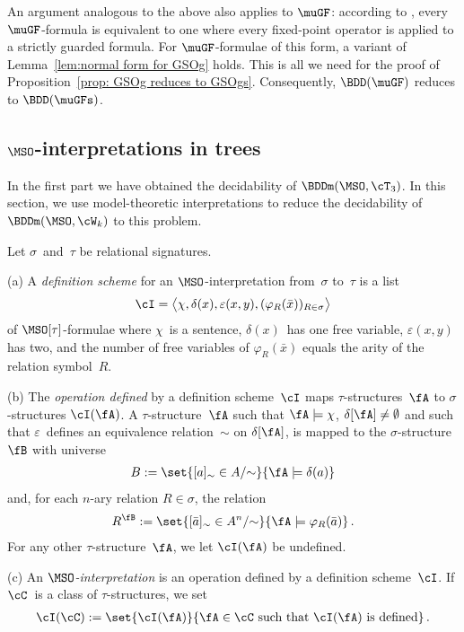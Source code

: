 \documentclass{LMCS}
\begin{document}
An argument analogous to the above
also applies to $\muGF$\?: according to \cite{GHO},
every $\muGF$-formula is equivalent to one where
every fixed-point operator is applied to a
strictly guarded formula.
For $\muGF$-formulae of this form,
a variant of Lemma~\ref{lem:normal form for GSOg} holds.
This is all we need for the proof of Proposition~\ref{prop: GSOg reduces to GSOgs}.
Consequently, $\BDD(\muGF)$ reduces to $\BDD(\muGFs)$.


\subsection{\boldmath $\MSO$-interpretations in trees}


In the first part we have obtained the decidability of $\BDDm(\MSO,\cT_3)$.
In this section, we use model-theoretic interpretations to
reduce the decidability of $\BDDm(\MSO,\cW_k)$ to this problem.

\begin{defi}
Let $\sigma$~and~$\tau$ be relational signatures.

\textup{(a)} A \emph{definition scheme} for an $\MSO$-interpretation
from~$\sigma$ to~$\tau$ is a list
\begin{align*}
  \cI = \bigl\langle\chi, \delta(x),\varepsilon(x,y),(\varphi_R(\bar x))_{R \in \sigma}\bigr\rangle
\end{align*}
of $\MSO[\tau]$-formulae where
$\chi$~is a sentence,
$\delta(x)$~has one free variable, $\varepsilon(x,y)$ has two,
and the number of free variables of $\varphi_R(\bar x)$ equals the arity of the
relation symbol~$R$.

\textup{(b)} The \emph{operation defined} by a definition scheme~$\cI$
maps $\tau$-structures~$\fA$ to $\sigma$-structures $\cI(\fA)$.
A $\tau$-structure~$\fA$ such that
$\fA \models \chi$, $\delta[\fA] \neq \emptyset$ 
and such that $\varepsilon$~defines an equivalence relation~$\sim$
on $\delta[\fA]$, 
is mapped to the $\sigma$-structure~$\fB$ with universe
\begin{align*}
  B := \set{ [a]_\sim \in A/{\sim} }{ \fA \models \delta(a) }
\end{align*}
and, for each $n$-ary relation $R \in \sigma$, the relation
\begin{align*}
  R^\fB := \set{ [\bar a]_\sim \in A^n/{\sim} }{ \fA \models \varphi_R(\bar a) }\,.
\end{align*}
For any other $\tau$-structure~$\fA$, we let $\cI(\fA)$ be undefined.

\textup{(c)} An \emph{$\MSO$-interpretation} is an operation defined
by a definition scheme~$\cI$.
If $\cC$~is a class of $\tau$-structures, we set
\begin{align*}
  \cI(\cC) := \set{ \cI(\fA) }{ \fA \in \cC \text{ such that } \cI(\fA) \text{ is defined} }\,.
\end{align*}
\end{defi}
\end{document}
